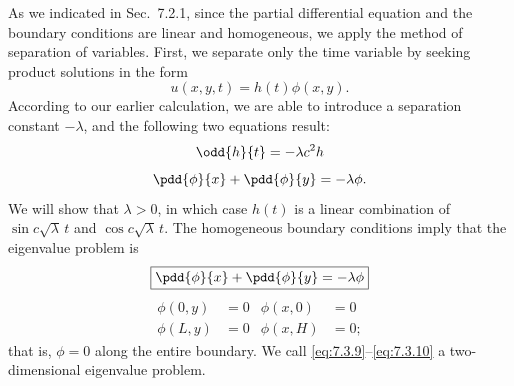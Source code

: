 As we indicated in Sec.~7.2.1, since the partial differential equation and the boundary conditions are linear and homogeneous, we apply the method of separation of variables.  First, we separate only the time variable by seeking product solutions in the form
\begin{equation}
u(x,y,t) = h(t)\phi(x,y).
\label{eq:7.3.6}
\end{equation}
According to our earlier calculation, we are able to introduce a separation constant $-\lambda$, and the following two equations result:
\begin{equation}
\odd{h}{t} = -\lambda c^2 h
\label{eq:7.3.7}
\end{equation}
\begin{equation}
\pdd{\phi}{x} + \pdd{\phi}{y} = -\lambda\phi.
\label{eq:7.3.8}
\end{equation}
We will show that $\lambda > 0$, in which case $h(t)$ is a linear combination of $\sin c\sqrt{\lambda}\,t$ and $\cos c\sqrt{\lambda}\,t$.  The homogeneous boundary conditions imply that the eigenvalue problem is
\begin{equation}
\boxed{\pdd{\phi}{x} + \pdd{\phi}{y} = -\lambda\phi}
\label{eq:7.3.9}
\end{equation}
\begin{equation}
\boxed{\begin{aligned}
\phi(0,y) &= 0 & \phi(x,0) &= 0 \\
\phi(L,y) &= 0 & \phi(x,H) &= 0;
\end{aligned}}
\label{eq:7.3.10}
\end{equation}
that is, $\phi = 0$ along the entire boundary.  We call \eqref{eq:7.3.9}--\eqref{eq:7.3.10} a two-dimensional eigenvalue problem.

